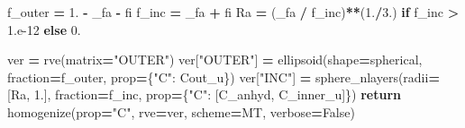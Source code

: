 \documentclass[
  a4paper,
  numbers=noendperiod,
  DIV=12]{scrreprt}
\newenvironment{Shaded}{\begin{snugshade}}{\end{snugshade}}
\newcommand{\ControlFlowTok}[1]{\textcolor[rgb]{0.13,0.29,0.53}{\textbf{#1}}}
\newcommand{\FloatTok}[1]{\textcolor[rgb]{0.00,0.00,0.81}{#1}}
\newcommand{\NormalTok}[1]{#1}
\newcommand{\OperatorTok}[1]{\textcolor[rgb]{0.81,0.36,0.00}{\textbf{#1}}}
\newcommand{\StringTok}[1]{\textcolor[rgb]{0.31,0.60,0.02}{#1}}
\newcommand{\VariableTok}[1]{\textcolor[rgb]{0.00,0.00,0.00}{#1}}
\begin{document}
\begin{Shaded}
\begin{Highlighting}[]
\NormalTok{    f\_outer }\OperatorTok{=} \FloatTok{1.} \OperatorTok{{-}}\NormalTok{ \_fa }\OperatorTok{{-}}\NormalTok{ fi}
\NormalTok{    f\_inc   }\OperatorTok{=}\NormalTok{ \_fa }\OperatorTok{+}\NormalTok{ fi}
\NormalTok{    Ra      }\OperatorTok{=}\NormalTok{ (\_fa }\OperatorTok{/}\NormalTok{ f\_inc)}\OperatorTok{**}\NormalTok{(}\FloatTok{1.}\OperatorTok{/}\FloatTok{3.}\NormalTok{) }\ControlFlowTok{if}\NormalTok{ f\_inc }\OperatorTok{\textgreater{}} \FloatTok{1.e{-}12} \ControlFlowTok{else} \FloatTok{0.}

\NormalTok{    ver }\OperatorTok{=}\NormalTok{ rve(matrix}\OperatorTok{=}\StringTok{"OUTER"}\NormalTok{)}
\NormalTok{    ver[}\StringTok{"OUTER"}\NormalTok{] }\OperatorTok{=}\NormalTok{ ellipsoid(shape}\OperatorTok{=}\NormalTok{spherical, fraction}\OperatorTok{=}\NormalTok{f\_outer,}
\NormalTok{                             prop}\OperatorTok{=}\NormalTok{\{}\StringTok{"C"}\NormalTok{: Cout\_u\})}
\NormalTok{    ver[}\StringTok{"INC"}\NormalTok{]   }\OperatorTok{=}\NormalTok{ sphere\_nlayers(radii}\OperatorTok{=}\NormalTok{[Ra, }\FloatTok{1.}\NormalTok{],}
\NormalTok{                                  fraction}\OperatorTok{=}\NormalTok{f\_inc,}
\NormalTok{                                  prop}\OperatorTok{=}\NormalTok{\{}\StringTok{"C"}\NormalTok{: [C\_anhyd, C\_inner\_u]\})}
    \ControlFlowTok{return}\NormalTok{ homogenize(prop}\OperatorTok{=}\StringTok{"C"}\NormalTok{, rve}\OperatorTok{=}\NormalTok{ver, scheme}\OperatorTok{=}\NormalTok{MT, verbose}\OperatorTok{=}\VariableTok{False}\NormalTok{)}
\end{Highlighting}
\end{Shaded}
\end{document}
